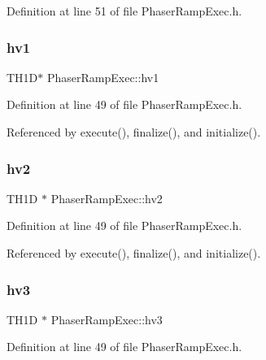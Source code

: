 Definition at line 51 of file Phaser\+Ramp\+Exec.\+h.

\mbox{\label{classPhaserRampExec_ad2a2a82a0be74bc39c84b580e33d9c34}} 
\subsubsection{\texorpdfstring{hv1}{hv1}}
{\footnotesize\ttfamily T\+H1D$\ast$ Phaser\+Ramp\+Exec\+::hv1\hspace{0.3cm}{\ttfamily [private]}}



Definition at line 49 of file Phaser\+Ramp\+Exec.\+h.



Referenced by execute(), finalize(), and initialize().

\mbox{\label{classPhaserRampExec_a9762fd546432b5f3dffc4c5323af56ac}} 
\subsubsection{\texorpdfstring{hv2}{hv2}}
{\footnotesize\ttfamily T\+H1D $\ast$ Phaser\+Ramp\+Exec\+::hv2\hspace{0.3cm}{\ttfamily [private]}}



Definition at line 49 of file Phaser\+Ramp\+Exec.\+h.



Referenced by execute(), finalize(), and initialize().

\mbox{\label{classPhaserRampExec_ad3127f38a360044f7ad8fed272f916f9}} 
\subsubsection{\texorpdfstring{hv3}{hv3}}
{\footnotesize\ttfamily T\+H1D $\ast$ Phaser\+Ramp\+Exec\+::hv3\hspace{0.3cm}{\ttfamily [private]}}



Definition at line 49 of file Phaser\+Ramp\+Exec.\+h.



